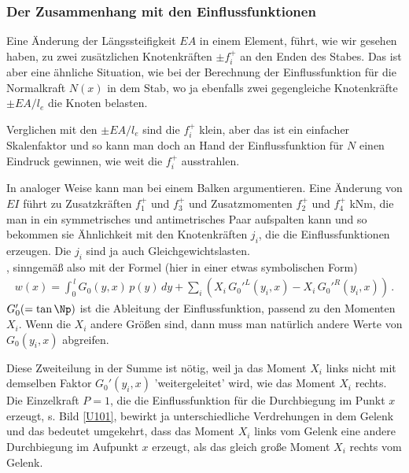 {{{{{\textcolor{blau2}{\subsubsection*{Der Zusammenhang mit den Einflussfunktionen}}}

Eine \"{A}nderung der L\"{a}ngssteifigkeit $EA$ in einem Element, f\"{u}hrt, wie wir gesehen haben, zu zwei zus\"{a}tzlichen Knotenkr\"{a}ften $\pm f_i^+$ an den Enden des Stabes. Das ist aber eine \"{a}hnliche Situation, wie bei der Berechnung der Einflussfunktion f\"{u}r die Normalkraft $N(x)$ in dem Stab, wo ja ebenfalls zwei gegengleiche Knotenkr\"{a}fte $\pm EA/l_e$ die Knoten belasten.

Verglichen mit den $\pm EA/l_e$ sind die $f_i^+$ klein, aber das ist ein einfacher Skalenfaktor und so kann man doch an Hand der Einflussfunktion f\"{u}r $N$ einen Eindruck gewinnen, wie weit die $f_i^+$ ausstrahlen.

In analoger Weise kann man bei einem Balken argumentieren. Eine \"{A}nderung von $EI $ f\"{u}hrt zu Zusatzkr\"{a}ften $f_1^+$ und $f_3^+$ und Zusatzmomenten $f_2^+$ und $f_4^+$ kNm, die man in ein symmetrisches und antimetrisches Paar aufspalten kann
und so bekommen sie \"{A}hnlichkeit mit den Knotenkr\"{a}ften $j_i$, die die Einflussfunktionen erzeugen. Die $j_i$ sind ja auch Gleichgewichtslasten.
\\

, sinngem\"{a}{\ss} also mit der Formel (hier in einer etwas symbolischen Form)
\begin{align}\label{Eq71}
w(x) = \int_0^{\,l} G_0(y,x)\,p(y)\,dy + \sum_i (X_i\,G_0'^L(y_i,x) - X_i\,G_0'^R(y_i,x))\,.
\end{align}
$G_0' (= \tan \Np)$ ist die Ableitung der Einflussfunktion, passend zu den Momenten $X_i$. Wenn die $X_i$ andere Gr\"{o}{\ss}en sind, dann muss man nat\"{u}rlich andere Werte von $G_0(y_i,x)$ abgreifen.

Diese Zweiteilung in der Summe ist n\"{o}tig, weil ja das Moment $X_i$ links nicht mit demselben Faktor $G_0'(y_i,x)$ 'weitergeleitet' wird, wie das Moment $X_i$ rechts. Die Einzelkraft $P = 1 $, die die Einflussfunktion f\"{u}r die Durchbiegung im Punkt $x $ erzeugt,  s. Bild \ref{U101}, bewirkt ja unterschiedliche Verdrehungen in dem Gelenk und das bedeutet umgekehrt, dass das Moment $X_i $ links vom Gelenk eine andere Durchbiegung im Aufpunkt $x$ erzeugt, als das gleich gro{\ss}e Moment $X_i $ rechts vom Gelenk. \\

}}}}

